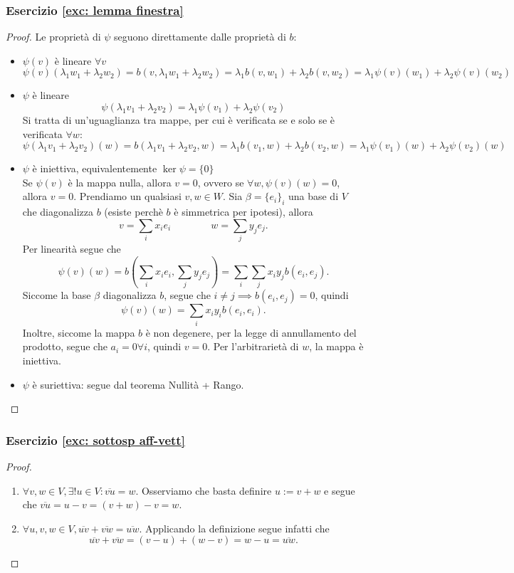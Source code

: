 \documentclass{article}     %
\begin{document}
\subsubsection*{Esercizio \ref{exc: lemma finestra}}\label{sol: lemma finestra}
\begin{proof}Le proprietà di $\psi$ seguono direttamente dalle proprietà di $b$:
    \begin{itemize}
        \item $\psi(v)$ è lineare $\forall v$
            \[\psi(v)(\lambda_1w_1+\lambda_2w_2)=b(v,\lambda_1w_1+\lambda_2w_2)= \lambda_1b(v,w_1)+\lambda_2b(v,w_2) = \lambda_1\psi(v)(w_1)+\lambda_2\psi(v)(w_2) \]
        \item  $\psi$ è lineare
        \[\psi(\lambda_1v_1+\lambda_2v_2)=\lambda_1\psi(v_1)+\lambda_2\psi(v_2)\]
        Si tratta di un'uguaglianza tra mappe, per cui è verificata se e solo se è verificata $\forall w$:
        \[\psi(\lambda_1v_1+\lambda_2v_2)(w)= b(\lambda_1v_1+\lambda_2v_2,w)= \lambda_1b(v_1,w)+\lambda_2b(v_2,w)= \lambda_1\psi(v_1)(w)+\lambda_2\psi(v_2)(w)\]
        \item $\psi$ è iniettiva, equivalentemente $\ker \psi =\{0\}$
        \\Se $\psi(v)$ è la mappa nulla, allora $v=0$, ovvero se $\forall w, \psi(v)(w)=0$, allora $v=0$.
        Prendiamo un qualsiasi $v,w\in W$. Sia $\beta=\{e_i\}_i$ una base di $V$ che diagonalizza $b$ (esiste perchè $b$ è simmetrica per ipotesi), allora
        \[v=\sum_ix_ie_i\qquad \qquad w=\sum_jy_je_j.\]
        Per linearità segue che
        \[\psi(v)(w)=b\left(\sum_ix_ie_i, \sum_jy_je_j\right)=\sum_i\sum_jx_iy_jb(e_i,e_j).\]
        Siccome la base $\beta$ diagonalizza $b$, segue che $i\neq j\implies b(e_i,e_j)=0$, quindi 
        \[\psi(v)(w)=\sum_ix_iy_ib(e_i,e_i).\]
        Inoltre, siccome la mappa $b$ è non degenere, per la legge di annullamento del prodotto, segue che $a_i=0\forall i$, quindi $v=0$. Per l'arbitrarietà di $w$, la mappa è iniettiva.
        \item $\psi$ è suriettiva: segue dal teorema Nullità + Rango.
    \end{itemize}
\end{proof}

\subsubsection*{Esercizio \ref{exc: sottosp aff-vett}}\label{sol: sottosp aff-vett}
\begin{proof}~
    \begin{enumerate}[label=$\roman*)$]
        \item $\forall v,w\in V,\exists!u\in V:\overline{vu}=w$. Osserviamo che basta definire $u:=v+w$ e segue che $\overline{vu}=u-v=(v+w)-v=w$.
        \item $\forall u,v,w\in V, \overline{uv}+\overline{vw}=\overline{uw}$. Applicando la definizione segue infatti che 
        \[\overline{uv}+\overline{vw}= (v-u)+(w-v)=w-u=\overline{uw}.\]
    \end{enumerate}
\end{proof}
\end{document}
